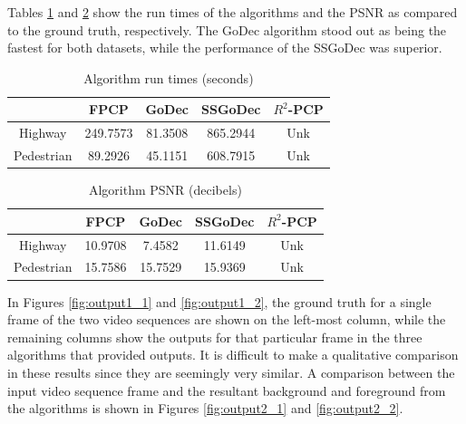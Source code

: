 \documentclass[conference]{IEEEtran}
\begin{document}
Tables \ref{tab:runtime} and \ref{tab:PSNR} show the run times of the algorithms and the PSNR as compared to the ground truth, respectively. The GoDec algorithm stood out as being the fastest for both datasets, while the performance of the SSGoDec was superior.


\begin{table}[h]
\renewcommand{\arraystretch}{1.2}
\caption{Algorithm run times (seconds)} \label{tab:runtime}
\centering
\begin{tabular}{|c|c|c|c|c|}
    \hline
      & FPCP & GoDec & SSGoDec & $R^2$-PCP\\
    \hline
    Highway & 249.7573 & 81.3508 & 865.2944 & Unk\\
    \hline
    Pedestrian & 89.2926 & 45.1151 & 608.7915 & Unk\\
    \hline
\end{tabular}
\end{table}

\begin{table}[h]
\renewcommand{\arraystretch}{1.2}
\caption{Algorithm PSNR (decibels)} \label{tab:PSNR}
\centering
\begin{tabular}{|c|c|c|c|c|}
    \hline
      & FPCP & GoDec & SSGoDec & $R^2$-PCP\\
    \hline
    Highway & 10.9708 & 7.4582 & 11.6149 & Unk\\
    \hline
    Pedestrian & 15.7586 & 15.7529 & 15.9369 & Unk\\
    \hline
\end{tabular}
\end{table}



In Figures \ref{fig:output1_1} and \ref{fig:output1_2}, the ground truth for a single frame of the two video sequences are shown on the left-most column, while the remaining columns show the outputs for that particular frame in the three algorithms that provided outputs. It is difficult to make a qualitative comparison in these results since they are seemingly very similar. A comparison between the input video sequence frame and the resultant background and foreground from the algorithms is shown in Figures \ref{fig:output2_1} and \ref{fig:output2_2}.
\end{document}
